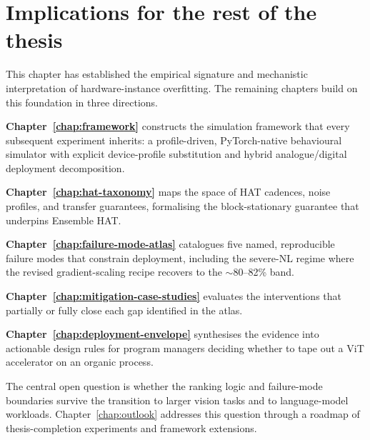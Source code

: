\section{Implications for the rest of the thesis}
\label{sec:ch1-implications}

This chapter has established the empirical signature and mechanistic interpretation of hardware-instance overfitting.  The remaining chapters build on this foundation in three directions.

\textbf{Chapter~\ref{chap:framework}} constructs the simulation framework that every subsequent experiment inherits: a profile-driven, PyTorch-native behavioural simulator with explicit device-profile substitution and hybrid analogue/digital deployment decomposition.

\textbf{Chapter~\ref{chap:hat-taxonomy}} maps the space of HAT cadences, noise profiles, and transfer guarantees, formalising the block-stationary guarantee that underpins Ensemble HAT.

\textbf{Chapter~\ref{chap:failure-mode-atlas}} catalogues five named, reproducible failure modes that constrain deployment, including the severe-NL regime where the revised gradient-scaling recipe recovers to the $\sim$80--82\% band.

\textbf{Chapter~\ref{chap:mitigation-case-studies}} evaluates the interventions that partially or fully close each gap identified in the atlas.

\textbf{Chapter~\ref{chap:deployment-envelope}} synthesises the evidence into actionable design rules for program managers deciding whether to tape out a ViT accelerator on an organic process.

The central open question is whether the ranking logic and failure-mode boundaries survive the transition to larger vision tasks and to language-model workloads.  Chapter~\ref{chap:outlook} addresses this question through a roadmap of thesis-completion experiments and framework extensions.
